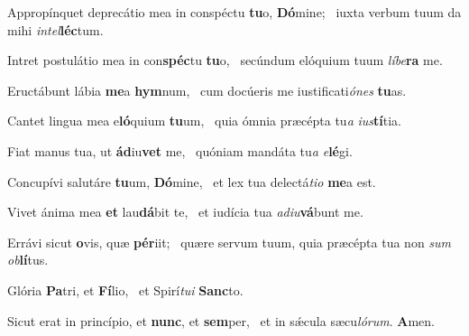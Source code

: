 \item Appropínquet deprecátio mea in conspéctu \textbf{tu}o, \textbf{Dó}mine;~\psstar{} iuxta verbum tuum da mihi \textit{intel}\textbf{léc}tum.

\item Intret postulátio mea in con\textbf{spéc}tu \textbf{tu}o,~\psstar{} secúndum elóquium tuum \textit{líbe}\textbf{ra} me.

\item Eructábunt lábia \textbf{me}a \textbf{hym}num,~\psstar{} cum docúeris me iustificati\textit{ónes} \textbf{tu}as.

\item Cantet lingua mea e\textbf{ló}quium \textbf{tu}um,~\psstar{} quia ómnia præcépta tu\textit{a} \textit{ius}\textbf{tí}tia.

\item Fiat manus tua, ut \textbf{ád}iu\textbf{vet} me,~\psstar{} quóniam mandáta tu\textit{a} \textit{e}\textbf{lé}gi.

\item Concupívi salutáre \textbf{tu}um, \textbf{Dó}mine,~\psstar{} et lex tua delectá\textit{tio} \textbf{me}a est.

\item Vivet ánima mea \textbf{et} lau\textbf{dá}bit te,~\psstar{} et iudícia tua \textit{adiu}\textbf{vá}bunt me.

\item Errávi sicut \textbf{o}vis, quæ \textbf{pér}iit;~\psstar{} quære servum tuum, quia præcépta tua non \textit{sum} \textit{ob}\textbf{lí}tus.

\item Glória \textbf{Pa}tri, et \textbf{Fí}lio,~\psstar{} et Spirí\textit{tui} \textbf{Sanc}to.

\item Sicut erat in princípio, et \textbf{nunc}, et \textbf{sem}per,~\psstar{} et in sǽcula sæcu\textit{lórum}. \textbf{A}men.